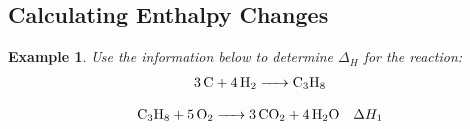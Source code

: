 \documentclass{article}  %
\newtheorem{exmp}{Example}
\begin{document}
\subsection*{Calculating Enthalpy Changes}
\begin{exmp}
    Use the information below to determine $\Delta_H$ for the reaction:
    \begin{equation*}
        \begin{aligned}
            \ce{3 C + 4 H2 -> C3H8}
        \end{aligned}
    \end{equation*}
\end{exmp}
\begin{equation*}
    \begin{aligned}
        &\ce{C3H8 + 5 O2 -> 3 CO2 + 4 H2O} &\Delta H_1 \\
    \end{aligned}
\end{equation*}
\end{document}
